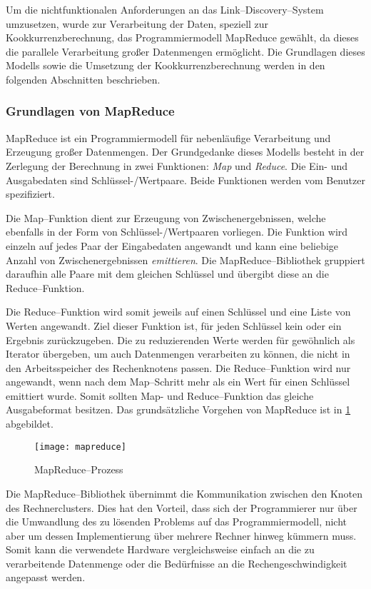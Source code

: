 Um die nichtfunktionalen Anforderungen an das Link--Discovery--System umzusetzen, wurde zur Verarbeitung der Daten, speziell zur Kookkurrenzberechnung, das Programmiermodell MapReduce gewählt, da dieses die parallele Verarbeitung großer Datenmengen ermöglicht. Die Grundlagen dieses Modells sowie die Umsetzung der Kookkurrenzberechnung werden in den folgenden Abschnitten beschrieben.

\subsubsection{Grundlagen von MapReduce}
\label{mapreduce_basic}

MapReduce \cite{dg2004} ist ein Programmiermodell für nebenläufige Verarbeitung und Erzeugung großer Datenmengen. Der Grundgedanke dieses Modells besteht in der Zerlegung der Berechnung in zwei Funktionen: \emph{Map} und \emph{Reduce}. Die Ein- und Ausgabedaten sind Schlüssel-/Wertpaare. Beide Funktionen werden vom Benutzer spezifiziert.

Die Map--Funktion dient zur Erzeugung von Zwischenergebnissen, welche ebenfalls in der Form von Schlüssel-/Wertpaaren vorliegen. Die Funktion wird einzeln auf jedes Paar der Eingabedaten angewandt und kann eine beliebige Anzahl von Zwischenergebnissen \emph{emittieren}. Die MapReduce--Bibliothek gruppiert daraufhin alle Paare mit dem gleichen Schlüssel und übergibt diese an die Reduce--Funktion.

Die Reduce--Funktion wird somit jeweils auf einen Schlüssel und eine Liste von Werten angewandt. Ziel dieser Funktion ist, für jeden Schlüssel kein oder ein Ergebnis zurückzugeben. Die zu reduzierenden Werte werden für gewöhnlich als Iterator übergeben, um auch Datenmengen verarbeiten zu können, die nicht in den Arbeitsspeicher des Rechenknotens passen. Die Reduce--Funktion wird nur angewandt, wenn nach dem Map--Schritt mehr als ein Wert für einen Schlüssel emittiert wurde. Somit sollten Map- und Reduce--Funktion das gleiche Ausgabeformat besitzen. Das grundsätzliche Vorgehen von MapReduce ist in \cref{fig:mapreduce} abgebildet.

\begin{figure}
\centering
\texttt{[image: mapreduce]}
\caption{MapReduce--Prozess}
\label{fig:mapreduce}
\end{figure}

Die MapReduce--Bibliothek übernimmt die Kommunikation zwischen den Knoten des Rechnerclusters. Dies hat den Vorteil, dass sich der Programmierer nur über die Umwandlung des zu lösenden Problems auf das Programmiermodell, nicht aber um dessen Implementierung über mehrere Rechner hinweg kümmern muss. Somit kann die verwendete Hardware vergleichsweise einfach an die zu verarbeitende Datenmenge oder die Bedürfnisse an die Rechengeschwindigkeit angepasst werden.

